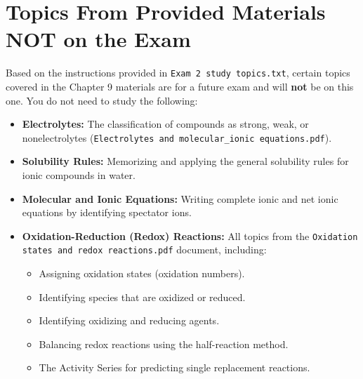 \documentclass{article}
\begin{document}
\bigskip

\section*{Topics From Provided Materials NOT on the Exam}

Based on the instructions provided in \texttt{Exam 2 study topics.txt}, certain topics covered in the Chapter 9 materials are for a future exam and will \textbf{not} be on this one. You do not need to study the following:
\begin{itemize}[itemsep=5pt]
    \item \textbf{Electrolytes:} The classification of compounds as strong, weak, or nonelectrolytes (\texttt{Electrolytes and molecular\_ionic equations.pdf}).
    \item \textbf{Solubility Rules:} Memorizing and applying the general solubility rules for ionic compounds in water.
    \item \textbf{Molecular and Ionic Equations:} Writing complete ionic and net ionic equations by identifying spectator ions.
    \item \textbf{Oxidation-Reduction (Redox) Reactions:} All topics from the \texttt{Oxidation states and redox reactions.pdf} document, including:
    \begin{itemize}
        \item Assigning oxidation states (oxidation numbers).
        \item Identifying species that are oxidized or reduced.
        \item Identifying oxidizing and reducing agents.
        \item Balancing redox reactions using the half-reaction method.
        \item The Activity Series for predicting single replacement reactions.
    \end{itemize}
\end{itemize}

\newpage


\end{document}
